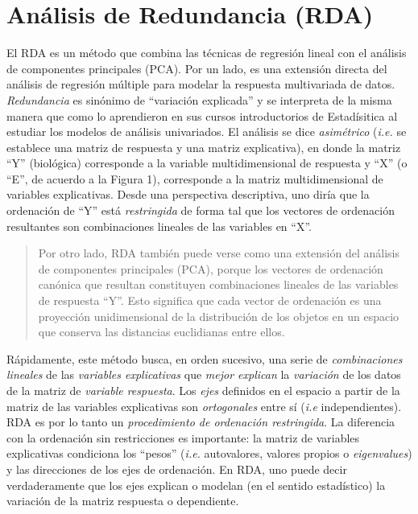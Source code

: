 \documentclass[
]{book}
\begin{document}
\hypertarget{anuxe1lisis-de-redundancia-rda}{%
\section{Análisis de Redundancia (RDA)}\label{anuxe1lisis-de-redundancia-rda}}

El RDA es un método que combina las técnicas de regresión lineal con el análisis de componentes principales (PCA). Por un lado, es una extensión directa del análisis de regresión múltiple para modelar la respuesta multivariada de datos. \emph{Redundancia} es sinónimo de ``variación explicada'' y se interpreta de la misma manera que como lo aprendieron en sus cursos introductorios de Estadísitica al estudiar los modelos de análisis univariados. El análisis se dice \emph{asimétrico} (\emph{i.e.} se establece una matriz de respuesta y una matriz explicativa), en donde la matriz ``Y'' (biológica) corresponde a la variable multidimensional de respuesta y ``X'' (o ``E'', de acuerdo a la Figura 1), corresponde a la matriz multidimensional de variables explicativas. Desde una perspectiva descriptiva, uno diría que la ordenación de ``Y'' está \emph{restringida} de forma tal que los vectores de ordenación resultantes son combinaciones lineales de las variables en ``X''.

\begin{quote}
Por otro lado, RDA también puede verse como una extensión del análisis de componentes principales (PCA), porque los vectores de ordenación canónica que resultan constituyen combinaciones lineales de las variables de respuesta ``Y''. Esto significa que cada vector de ordenación es una proyección unidimensional de la distribución de los objetos en un espacio que conserva las distancias euclidianas entre ellos.
\end{quote}

Rápidamente, este método busca, en orden sucesivo, una serie de \emph{combinaciones lineales} de las \emph{variables explicativas} que \emph{mejor explican} la \emph{variación} de los datos de la matriz de \emph{variable respuesta}. Los \emph{ejes} definidos en el espacio a partir de la matriz de las variables explicativas son \emph{ortogonales} entre sí (\emph{i.e} independientes). RDA es por lo tanto un \emph{procedimiento de ordenación restringida}. La diferencia con la ordenación sin restricciones es importante: la matriz de variables explicativas condiciona los ``pesos'' (\emph{i.e.} autovalores, valores propios o \emph{eigenvalues}) y las direcciones de los ejes de ordenación. En RDA, uno puede decir verdaderamente que los ejes explican o modelan (en el sentido estadístico) la variación de la matriz respuesta o dependiente.
\end{document}
